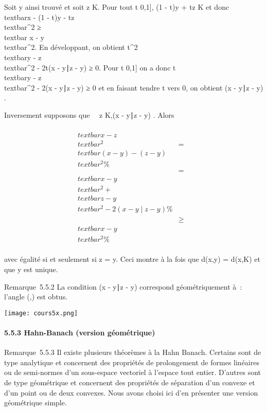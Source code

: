 \documentclass[]{article}
\begin{document}
Soit y ainsi trouvé et soit z \in K. Pour tout t \in {[}0,1{]}, (1 - t)y +
tz \in K et donc \\textbar{}x - (1 - t)y -
tz\\textbar{}^2 ≥\\textbar{} x
- y\\textbar{}^2. En développant, on obtient
t^2\\textbar{}y -
z\\textbar{}^2 - 2t(x -
y∣z - y) ≥ 0. Pour t \in{]}0,1{]} on a donc
t\\textbar{}y - z\\textbar{}^2
- 2(x - y∣z - y) ≥ 0 et en faisant tendre t
vers 0, on obtient (x - y∣z - y) .

Inversement supposons que \forall~~z \in
K,\quad (x - y∣z - y) .
Alors

\begin{align*} \\textbar{}x -
z\\textbar{}^2& =&
\\textbar{}(x - y) - (z -
y)\\textbar{}^2 \%&
\\ & =& \\textbar{}x -
y\\textbar{}^2 +\\textbar{} z -
y\\textbar{}^2 - 2(x -
y∣z - y)\%& \\
& ≥& \\textbar{}x -
y\\textbar{}^2 \%&
\\ \end{align*}

avec égalité si et seulement si z = y. Ceci montre à la fois que d(x,y)
= d(x,K) et que y est unique.

Remarque~5.5.2 La condition (x - y∣z - y) 
correspond géométriquement à~: l'angle
(\overrightarrowyx,\overrightarrowyz)
est obtus.

\texttt{[image: cours5x.png]}

\paragraph{5.5.3 Hahn-Banach (version géométrique)}

Remarque~5.5.3 Il existe plusieurs théorèmes à la Hahn Banach. Certains
sont de type analytique et concernent des propriétés de prolongement de
formes linéaires ou de semi-normes d'un sous-espace vectoriel à l'espace
tout entier. D'autres sont de type géométrique et concernent des
propriétés de séparation d'un convexe et d'un point ou de deux convexes.
Nous avons choisi ici d'en présenter une version géométrique simple.
\end{document}
